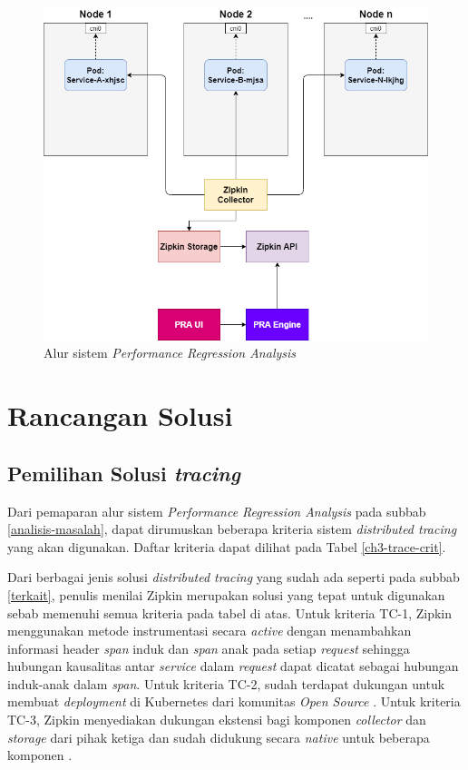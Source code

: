 \begin{figure}[!htb]
	\centering
	\includegraphics[width=1\textwidth]{resources/ch3/alur.png}
	\caption{Alur sistem \textit{Performance Regression Analysis}}
	\label{alur-pra}
\end{figure}

\section{Rancangan Solusi}

\subsection{Pemilihan Solusi \textit{tracing}}

Dari pemaparan alur sistem \textit{Performance Regression Analysis} pada subbab \ref{analisis-masalah}, dapat dirumuskan beberapa kriteria sistem \textit{distributed tracing} yang akan digunakan. Daftar kriteria dapat dilihat pada Tabel \ref{ch3-trace-crit}.

Dari berbagai jenis solusi \textit{distributed tracing} yang sudah ada seperti pada subbab \ref{terkait}, penulis menilai Zipkin merupakan solusi yang tepat untuk digunakan sebab memenuhi semua kriteria pada tabel di atas. Untuk kriteria TC-1, Zipkin menggunakan metode instrumentasi secara \textit{active} dengan menambahkan informasi header \textit{span} induk dan \textit{span} anak pada setiap \textit{request} sehingga hubungan kausalitas antar \textit{service} dalam \textit{request} dapat dicatat sebagai hubungan induk-anak dalam \textit{span}. Untuk kriteria TC-2, sudah terdapat dukungan untuk membuat \textit{deployment} di Kubernetes dari komunitas \textit{Open Source} \citep{zipkin-ambassador}. Untuk kriteria TC-3, Zipkin menyediakan dukungan ekstensi bagi komponen \textit{collector} dan \textit{storage} dari pihak ketiga dan sudah didukung secara \textit{native} untuk beberapa komponen \citep{zipkin-storage}.


